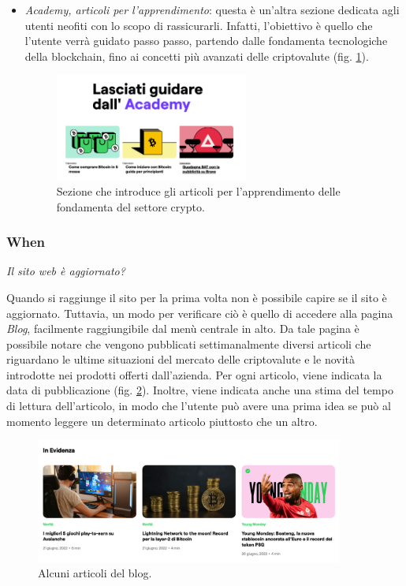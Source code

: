 \begin{itemize}
  \item \textit{Academy, articoli per l'apprendimento}: questa è un'altra 
  sezione dedicata agli utenti neofiti con lo scopo di rassicurarli. Infatti, 
  l'obiettivo è quello che l'utente verrà guidato passo passo, partendo 
  dalle fondamenta tecnologiche della blockchain, fino ai concetti più 
  avanzati delle criptovalute (fig. \ref{fig:academy}).
  \begin{figure}[H]
    \centering
    \includegraphics[width=0.60\textwidth]{res/images/academy.png}
    \caption{Sezione che introduce gli articoli per l'apprendimento 
    delle fondamenta del settore crypto.}
    \label{fig:academy}
  \end{figure}
\end{itemize}

\subsubsection{When}

\centerline{\textit{Il sito web è aggiornato?}}
Quando si raggiunge il sito per la prima volta non è possibile capire se 
il sito è aggiornato. Tuttavia, un modo per verificare ciò è quello di 
accedere alla pagina \textit{Blog}, facilmente raggiungibile dal menù 
centrale in alto. Da tale pagina è possibile notare che vengono pubblicati 
settimanalmente diversi articoli che riguardano le ultime situazioni del 
mercato delle criptovalute e le novità introdotte nei prodotti offerti 
dall'azienda. Per ogni articolo, viene indicata la data di pubblicazione 
(fig. \ref{fig:blog}). Inoltre, viene indicata anche una stima del tempo 
di lettura dell'articolo, in modo che l'utente può avere una prima idea se 
può al momento leggere un determinato articolo piuttosto che un altro.

\begin{figure}[H]
	\centering
	\includegraphics[width=0.90\textwidth]{res/images/blog-1.png}
	\caption{Alcuni articoli del blog.}
	\label{fig:blog}
\end{figure}


